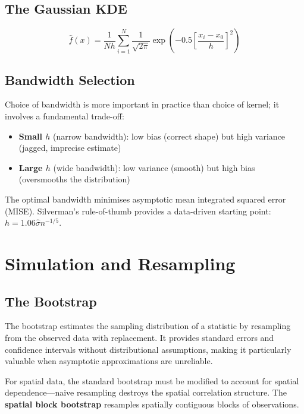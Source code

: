 \subsection{The Gaussian KDE}

\begin{equation}
  \hat{f}(x) = \frac{1}{Nh}\sum_{i=1}^{N}\frac{1}{\sqrt{2\pi}}
               \exp\!\left(-0.5\left[\frac{x_i - x_0}{h}\right]^2\right)
  \label{eq_GaussianKDE}
\end{equation}

\subsection{Bandwidth Selection}

Choice of bandwidth is more important in practice than choice of kernel;
it involves a fundamental trade-off:
\begin{itemize}
  \item \textbf{Small $h$} (narrow bandwidth): low bias (correct shape)
    but high variance (jagged, imprecise estimate)
  \item \textbf{Large $h$} (wide bandwidth): low variance (smooth)
    but high bias (oversmooths the distribution)
\end{itemize}

The optimal bandwidth minimises asymptotic mean integrated squared error
(MISE). Silverman's rule-of-thumb provides a data-driven starting point:
$h = 1.06\hat\sigma n^{-1/5}$.


\section{Simulation and Resampling}
\label{sec_Simulation}

\subsection{The Bootstrap}

The bootstrap \citep{Efron1979} estimates the sampling distribution of a
statistic by resampling from the observed data with replacement. It provides
standard errors and confidence intervals without distributional assumptions,
making it particularly valuable when asymptotic approximations are unreliable.

For spatial data, the standard bootstrap must be modified to account for
spatial dependence---naive resampling destroys the spatial correlation
structure. The \textbf{spatial block bootstrap} resamples spatially
contiguous blocks of observations.

